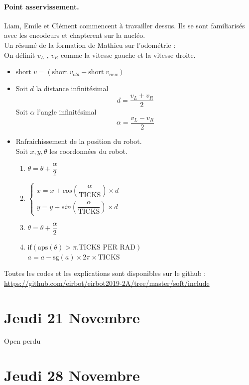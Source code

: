 \documentclass[a4paper,10pt]{report}
\theoremstyle{definition}
\begin{document}
\begin{spacing}{1.5}
\paragraph*{Point asservissement.}
Liam, Emile et Clément commencent à travailler dessus. Ils se sont familiarisés avec les encodeurs et chapterent sur la nucléo.\\
Un résumé de la formation de Mathieu sur l'odométrie : \\
On définit $v_L$ , $v_R$ comme la vitesse gauche et la vitesse droite.
\begin{itemize}
  \item $\text{short} \; v = (\text{short} \; v_{old} - \text{short} \; v_{new})$ %
  \item Soit $d$ la distance infinitésimal $$d = \dfrac{v_L+v_R}{2}$$ Soit $\alpha$ l'angle infinitésimal $$\alpha = \dfrac{v_L-v_R}{2}$$
  \item Rafraichissement de la position du robot. \\ Soit $x,y,\theta$ les coordonnées du robot. \begin{enumerate}
  \item $\theta = \theta + \dfrac{\alpha}{2}$
  \item $\begin{cases} x = x + cos(\dfrac{\alpha}{\text{TICKS}}) \times d \\ y = y + sin(\dfrac{\alpha}{\text{TICKS}}) \times d \end{cases}$
  \item $\theta = \theta + \dfrac{\alpha}{2}$
  \item $\text{if}(\text{aps}(\theta) > \pi.\text{TICKS PER RAD})$ \\ $a=a-\text{sg}(a)\times 2 \pi \times \text{TICKS}$
  \end{enumerate}
\end{itemize}
Toutes les codes et les explications sont disponibles sur le github : \url{https://github.com/eirbot/eirbot2019-2A/tree/master/soft/include}

\newpage
\section*{Jeudi 21 Novembre}
Open perdu

\newpage
\section*{Jeudi 28 Novembre}

\end{spacing}
\end{document}
